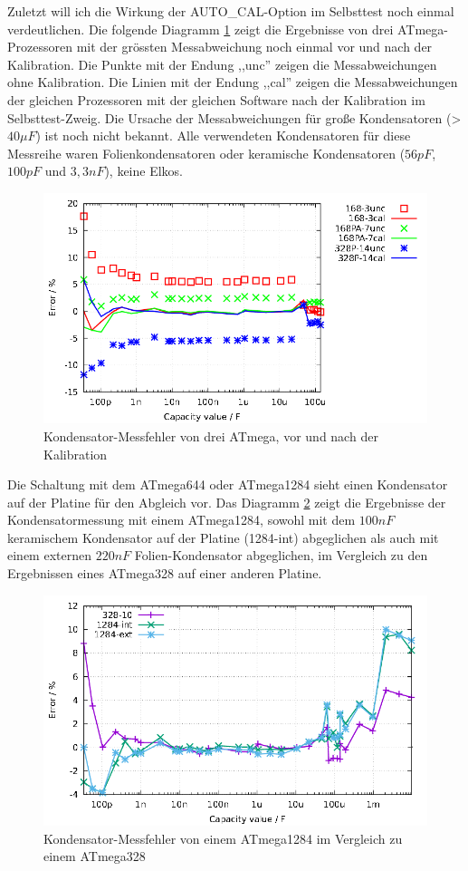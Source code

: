 Zuletzt will ich die Wirkung der AUTO\_CAL-Option im Selbsttest noch einmal verdeutlichen.
Die folgende Diagramm \ref{fig:MegaAuto} zeigt die Ergebnisse von drei ATmega-Prozessoren 
mit der grössten Messabweichung noch einmal vor und nach der Kalibration.
Die Punkte mit der Endung ,,unc'' zeigen die Messabweichungen ohne Kalibration.
Die Linien mit der Endung ,,cal'' zeigen die Messabweichungen der gleichen Prozessoren
mit der gleichen Software nach der Kalibration im Selbsttest-Zweig.
Die Ursache der Messabweichungen für große Kondensatoren (\textgreater\(40\mu F\)) ist
noch nicht bekannt. Alle verwendeten Kondensatoren für diese Messreihe waren
Folienkondensatoren oder keramische Kondensatoren (\(56pF\), \(100pF\) und \(3,3nF\)), keine Elkos.

\begin{figure}[H]
\centering
\includegraphics[width=16cm]{../GNU/MegaAuto.pdf}
\caption{Kondensator-Messfehler von drei ATmega, vor und nach der Kalibration}
\label{fig:MegaAuto}
\end{figure}

Die Schaltung mit dem ATmega644 oder ATmega1284 sieht einen Kondensator auf der Platine für den Abgleich
vor. Das Diagramm \ref{fig:Mega1284} zeigt die Ergebnisse der Kondensatormessung mit einem ATmega1284,
sowohl mit dem \(100nF\) keramischem Kondensator auf der Platine (1284-int) abgeglichen als auch mit
einem externen \(220nF\) Folien-Kondensator abgeglichen, im Vergleich zu den Ergebnissen eines ATmega328 auf einer
anderen Platine.

\begin{figure}[H]
\centering
\includegraphics[width=16cm]{../GNU/Mega1284.pdf}
\caption{Kondensator-Messfehler von einem ATmega1284 im Vergleich zu einem ATmega328}
\label{fig:Mega1284}
\end{figure}
